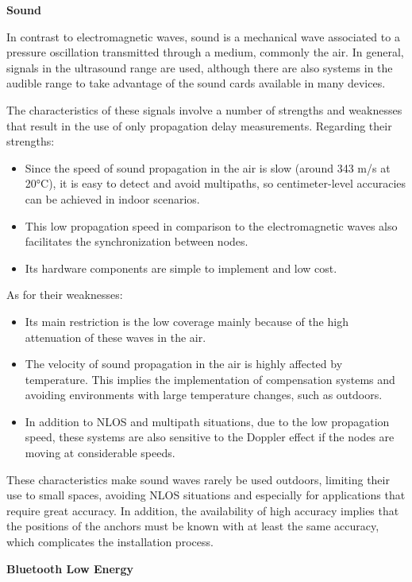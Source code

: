\begin{description}
	\item \textbf{Sound}
	
	In contrast to electromagnetic waves, sound is a mechanical wave associated to a pressure oscillation transmitted through a medium, commonly the air.
	In general, signals in the ultrasound range are used, although there are also systems in the audible range to take advantage of the sound cards available in many devices.
	
	The characteristics of these signals involve a number of strengths and weaknesses that result in the use of only propagation delay measurements.
	Regarding their strengths:	
	\begin{itemize}
		\item Since the speed of sound propagation in the air is slow (around 343 m/s at 20°C), it is easy to detect and avoid multipaths, so centimeter-level accuracies can be achieved in indoor scenarios.
		\item This low propagation speed in comparison to the electromagnetic waves also facilitates the synchronization between nodes.
		\item Its hardware components are simple to implement and low cost.		
	\end{itemize}
	As for their weaknesses:
	\begin{itemize}
		\item Its main restriction is the low coverage mainly because of the high attenuation of these waves in the air.
		\item The velocity of sound propagation in the air is highly affected by temperature. This implies the implementation of compensation systems and avoiding environments with large temperature changes, such as outdoors.
		\item In addition to NLOS and multipath situations, due to the low propagation speed, these systems are also sensitive to the Doppler effect if the nodes are moving at considerable speeds.
	\end{itemize}
		
	These characteristics make sound waves rarely be used outdoors, limiting their use to small spaces, avoiding NLOS situations and especially for applications that require great accuracy.
	In addition, the availability of high accuracy implies that the positions of the anchors must be known with at least the same accuracy, which complicates the installation process.
	\item \textbf{Bluetooth Low Energy}	
	

\end{description}
